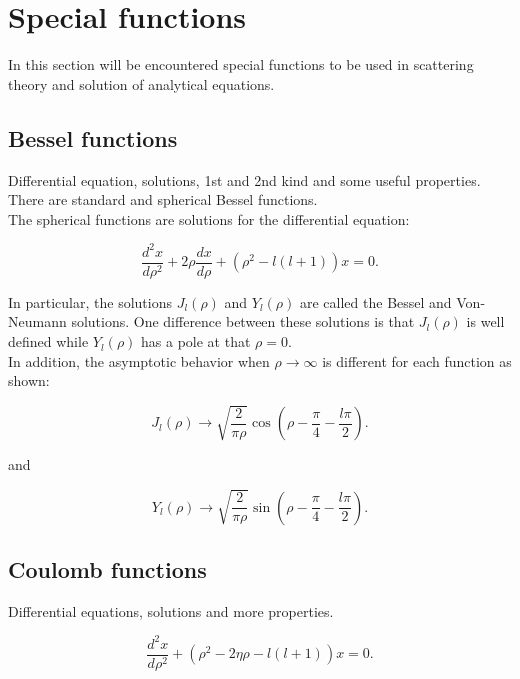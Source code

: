 \documentclass[openany]{book}
\begin{document}
\chapter{Special functions} \label{ap:specialFunctions}

In this section will be encountered special functions to be used in scattering theory and solution of analytical equations.

\section{Bessel functions} \label{sec:bessel}

Differential equation, solutions, 1st and 2nd kind and some useful properties. There are standard and spherical Bessel functions. \\

The spherical functions are solutions for the differential equation:

\begin{equation}
	\frac{d^2x}{d\rho^2} + 2\rho \frac{dx}{d\rho} + (\rho^2 - l(l+1))x= 0.
\end{equation}

In particular, the solutions $J_l(\rho)$ and $Y_l(\rho)$ are called the Bessel and Von-Neumann solutions. One difference between these solutions is that $J_l(\rho)$ is well defined while $Y_l(\rho)$  has a pole at that $\rho = 0$.   \\

In addition, the asymptotic behavior when $\rho \rightarrow \infty$ is different for each function as shown:

\begin{equation}
	J_l(\rho) \rightarrow \sqrt{ \frac{2}{\pi\rho}}\cos{\left(\rho - \frac{\pi}{4} - \frac{l\pi}{2}\right)}.
\end{equation}

and


\begin{equation}
	Y_l(\rho) \rightarrow \sqrt{\frac{2}{\pi\rho}}\sin{\left(\rho - \frac{\pi}{4} - \frac{l\pi}{2}\right)}.
\end{equation}


\section{Coulomb functions} \label{sec:coulomb}

Differential equations, solutions and more properties.

\begin{equation}
	\frac{d^2x}{d\rho^2}+ (\rho^2 - 2\eta \rho  - l(l+1) )x= 0.
\end{equation}
\end{document}
